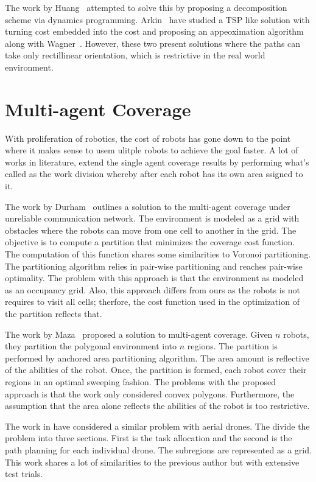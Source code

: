 \documentclass[../main.tex]{subfiles}
\begin{document}
The work by Huang~\cite{Huang2001optimal} attempted to solve this by proposing a decomposition scheme via dynamics programming. Arkin~\cite{arkin2005optimal} have studied a TSP like solution with turning cost embedded into the cost and proposing an appeoximation algorithm along with Wagner~\cite{wagner2001approximation}. However, these two present solutions where the paths can take only rectillinear orientation, which is restrictive in the real world environment.


\section{Multi-agent Coverage}
\label{section:multi_agent_coverage_lit_review}

With proliferation of robotics, the cost of robots has gone down to the point where it makes sense to usem ulitple robots to achieve the goal faster. A lot of works in literature, extend the single agent coverage results by performing what's called as the work division whereby after each robot has its own area ssigned to it.

The work by Durham~\cite{durham2012discrete} outlines a solution to the  multi-agent coverage under unreliable communication network. The environment is modeled as a grid with obstacles where the robots can move from one cell to another in the grid. The objective is to compute a partition that minimizes the coverage cost function. The computation of this function shares some similarities to Voronoi partitioning. The partitioning algorithm relies in pair-wise partitioning and reaches pair-wise optimality. The problem with this approach is that the environment as modeled as an occupancy grid. Also, this approach differs from ours as the robots is not requires to visit all cells; therfore, the cost function used in the optimization of the partition reflects that.

The work by Maza~\cite{maza2007multiple} proposed a solution to multi-agent coverage. Given $n$ robots, they partition the polygonal environment into $n$ regions. The partition is performed by anchored area partitioning algorithm. The area amount is reflective of the abilities of the robot. Once, the partition is formed, each robot cover their regions in an optimal sweeping fashion. The problems with the proposed approach is that the work only considered convex polygons. Furthermore, the assumption that the area alone reflects the abilities of the robot is too restrictive.

The work in \cite{barrientos2011aerial} have considered a similar problem with aerial drones. The divide the problem into three sections. First is the task allocation and the second is the path planning for each individual drone. The subregions are represented as a grid. This work shares a lot of similarities to the previous author but with extensive test trials.
\end{document}

